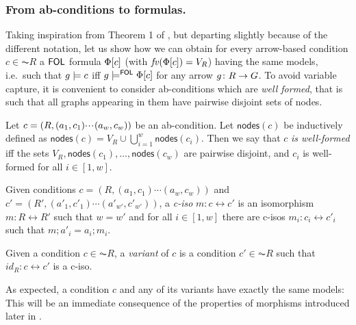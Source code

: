 \subsubsection{From ab-conditions to formulas.}

Taking inspiration from Theorem 1 of \cite{Rensink-FOL}, but departing slightly because of the different notation, let us show how we can obtain for every arrow-based condition $c\in \AC{R}$ a $\mathsf{FOL}$ formula $\Phi[{c}]$  (with $\mathit{fv}(\Phi[{c}]) = V_R$) having the same models, i.e.\ such that $g\models c$ iff $g\models^{\mathsf{FOL}} \Phi[{c}]$ for any arrow $g\colon R\rightarrow G$. To avoid variable capture, it is convenient to consider ab-conditions which are \emph{well formed}, that is such that all graphs appearing in them have pairwise disjoint sets of nodes. 

\newcommand{\nodes}[1]{\mathsf{nodes}(#1)} %

\begin{definition}\label{def:well-formed}
Let   $c=(R,(a_1,c_1){\cdotp\mkern-2mu\cdotp\mkern-2mu\cdotp\mkern1mu} (a_w,c_w))$ be an ab-condition. Let $\nodes{c}$ be inductively defined as $\nodes{c} = V_R \cup \bigcup_{i=1}^w \nodes{c_i}$. Then we say that $c$ \emph{is well-formed} iff the sets $V_R, \nodes{c_1}, \ldots, \nodes{c_w}$ are pairwise disjoint, and $c_i$ is well-formed for all $i\in [1,w]$.

Given conditions $c=(R,(a_1,c_1)\cdots (a_w,c_w))$ and $c'=(R',(a'_1,c'_1)\cdots (a'_{w'},c'_{w'}))$, a \emph{c-iso} $m: c \leftrightarrow c'$ is an isomorphism 
$m: R \leftrightarrow R'$ such that $w = w'$ and for all $i \in [1,w]$ there are c-isos $m_i: c_i \leftrightarrow c'_i$ such that $m; a'_i = a_i; m_i$.

Given a condition $c \in \AC{R}$, a \emph{variant} of $c$ is a condition $c' \in \AC{R}$ such that $id_R:c \leftrightarrow c'$ is a c-iso. 
\end{definition}
%
As expected, a condition $c$ and any of its variants have exactly the same models: This will be an immediate consequence of the properties of morphisms introduced later in .
%


